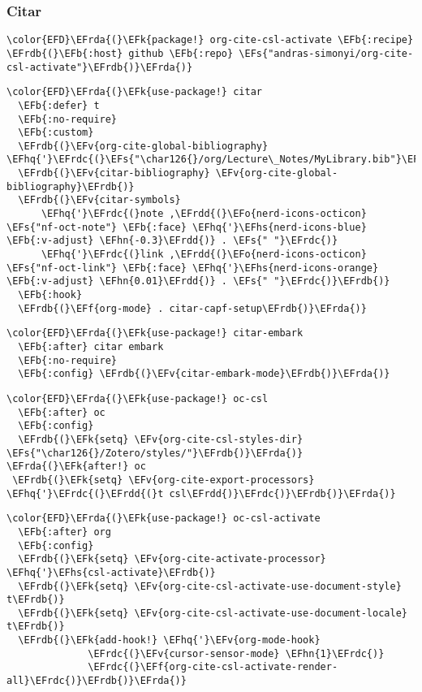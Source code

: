 \documentclass[12pt]{article}
\theoremstyle{plain}%
\theoremstyle{definition}
\theoremstyle{remark}
\newcommand{\EFs}[1]{\textcolor{EFs}{#1}} %
\newcommand{\EFk}[1]{\textcolor{EFk}{#1}} %
\newcommand{\EFb}[1]{\textcolor{EFb}{#1}} %
\newcommand{\EFf}[1]{\textcolor{EFf}{#1}} %
\newcommand{\EFv}[1]{\textcolor{EFv}{#1}} %
\newcommand{\EFo}[1]{\textcolor{EFo}{#1}} %
\newcommand{\EFhn}[1]{\textcolor{EFhn}{\textbf{#1}}} %
\newcommand{\EFhq}[1]{\textcolor{EFhq}{#1}} %
\newcommand{\EFhs}[1]{\textcolor{EFhs}{#1}} %
\newcommand{\EFrda}[1]{\textcolor{EFrda}{#1}} %
\newcommand{\EFrdb}[1]{\textcolor{EFrdb}{#1}} %
\newcommand{\EFrdc}[1]{\textcolor{EFrdc}{#1}} %
\newcommand{\EFrdd}[1]{\textcolor{EFrdd}{#1}} %
\begin{document}
\subsubsection{Citar}
\label{sec:orgcfb1aad}
\begin{Code}
\begin{Verbatim}
\color{EFD}\EFrda{(}\EFk{package!} org-cite-csl-activate \EFb{:recipe} \EFrdb{(}\EFb{:host} github \EFb{:repo} \EFs{"andras-simonyi/org-cite-csl-activate"}\EFrdb{)}\EFrda{)}
\end{Verbatim}
\end{Code}
\begin{Code}
\begin{Verbatim}
\color{EFD}\EFrda{(}\EFk{use-package!} citar
  \EFb{:defer} t
  \EFb{:no-require}
  \EFb{:custom}
  \EFrdb{(}\EFv{org-cite-global-bibliography} \EFhq{'}\EFrdc{(}\EFs{"\char126{}/org/Lecture\_Notes/MyLibrary.bib"}\EFrdc{)}\EFrdb{)}
  \EFrdb{(}\EFv{citar-bibliography} \EFv{org-cite-global-bibliography}\EFrdb{)}
  \EFrdb{(}\EFv{citar-symbols}
      \EFhq{'}\EFrdc{(}note ,\EFrdd{(}\EFo{nerd-icons-octicon} \EFs{"nf-oct-note"} \EFb{:face} \EFhq{'}\EFhs{nerd-icons-blue} \EFb{:v-adjust} \EFhn{-0.3}\EFrdd{)} . \EFs{" "}\EFrdc{)}
      \EFhq{'}\EFrdc{(}link ,\EFrdd{(}\EFo{nerd-icons-octicon} \EFs{"nf-oct-link"} \EFb{:face} \EFhq{'}\EFhs{nerd-icons-orange} \EFb{:v-adjust} \EFhn{0.01}\EFrdd{)} . \EFs{" "}\EFrdc{)}\EFrdb{)}
  \EFb{:hook}
  \EFrdb{(}\EFf{org-mode} . citar-capf-setup\EFrdb{)}\EFrda{)}
\end{Verbatim}
\end{Code}
\begin{Code}
\begin{Verbatim}
\color{EFD}\EFrda{(}\EFk{use-package!} citar-embark
  \EFb{:after} citar embark
  \EFb{:no-require}
  \EFb{:config} \EFrdb{(}\EFv{citar-embark-mode}\EFrdb{)}\EFrda{)}
\end{Verbatim}
\end{Code}
\begin{Code}
\begin{Verbatim}
\color{EFD}\EFrda{(}\EFk{use-package!} oc-csl
  \EFb{:after} oc
  \EFb{:config}
  \EFrdb{(}\EFk{setq} \EFv{org-cite-csl-styles-dir} \EFs{"\char126{}/Zotero/styles/"}\EFrdb{)}\EFrda{)}
\EFrda{(}\EFk{after!} oc
 \EFrdb{(}\EFk{setq} \EFv{org-cite-export-processors} \EFhq{'}\EFrdc{(}\EFrdd{(}t csl\EFrdd{)}\EFrdc{)}\EFrdb{)}\EFrda{)}

\end{Verbatim}
\end{Code}
\begin{Code}
\begin{Verbatim}
\color{EFD}\EFrda{(}\EFk{use-package!} oc-csl-activate
  \EFb{:after} org
  \EFb{:config}
  \EFrdb{(}\EFk{setq} \EFv{org-cite-activate-processor} \EFhq{'}\EFhs{csl-activate}\EFrdb{)}
  \EFrdb{(}\EFk{setq} \EFv{org-cite-csl-activate-use-document-style} t\EFrdb{)}
  \EFrdb{(}\EFk{setq} \EFv{org-cite-csl-activate-use-document-locale} t\EFrdb{)}
  \EFrdb{(}\EFk{add-hook!} \EFhq{'}\EFv{org-mode-hook}
              \EFrdc{(}\EFv{cursor-sensor-mode} \EFhn{1}\EFrdc{)}
              \EFrdc{(}\EFf{org-cite-csl-activate-render-all}\EFrdc{)}\EFrdb{)}\EFrda{)}

\end{Verbatim}
\end{Code}
\end{document}
